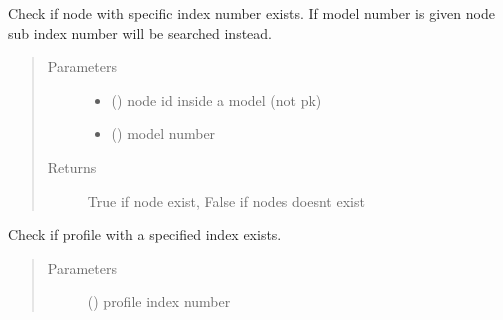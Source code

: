 \documentclass[letterpaper,10pt,english]{sphinxmanual}
\begin{document}
\begin{fulllineitems}
\begin{fulllineitems}
\label{\detokenize{api:beamon.database.database.Database.contains_node}}
Check if node with specific index number exists.
If model number is given node sub index number will be searched instead.
\begin{quote}\begin{description}
\item[{Parameters}] \leavevmode\begin{itemize}
\item {} 
 () \textendash{} node id inside a model (not pk)

\item {} 
 () \textendash{} model number

\end{itemize}

\item[{Returns}] \leavevmode
True if node exist, False if nodes doesnt exist

\end{description}\end{quote}

\end{fulllineitems}


\begin{fulllineitems}
\label{\detokenize{api:beamon.database.database.Database.contains_profile}}
Check if profile with a specified index exists.
\begin{quote}\begin{description}
\item[{Parameters}] \leavevmode
{} () \textendash{} profile index number


\end{description}
\end{quote}
\end{fulllineitems}
\end{fulllineitems}
\end{document}
